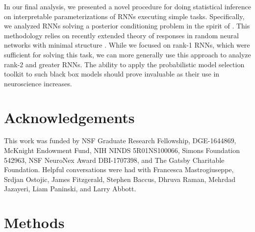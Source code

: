 \documentclass[11pt]{article}
\begin{document}
In our final analysis, we presented a novel procedure for doing statistical inference on interpretable parameterizations of RNNs executing simple tasks. 
Specifically, we analyzed RNNs solving a posterior conditioning problem in the spirit of \cite{echeveste2019cortical}. 
This methodology relies on recently extended theory of responses in random neural networks with minimal structure \cite{mastrogiuseppe2018linking}. 
While we focused on rank-1 RNNs, which were sufficient for solving this task, we can more generally use this approach to analyze rank-2 and greater RNNs.
The ability to apply the probabilistic model selection toolkit to such black box models should prove invaluable as their use in neuroscience increases.






\appendix

\section{Acknowledgements}
This work was funded by NSF Graduate Research Fellowship,  DGE-1644869, McKnight Endowment Fund, NIH NINDS 5R01NS100066, Simons Foundation 542963, NSF NeuroNex Award DBI-1707398, and The Gatsby Charitable Foundation.  Helpful conversations were had with Francesca Mastrogiuseppe, Srdjan Ostojic, James Fitzgerald, Stephen Baccus, Dhruva Raman, Mehrdad Jazayeri, Liam Paninski, and Larry Abbott.

\section{Methods}
\end{document}
